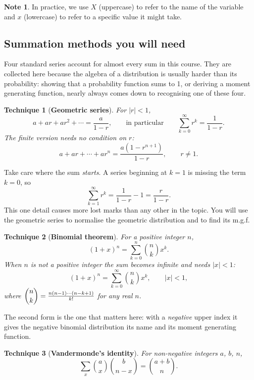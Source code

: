 \documentclass[12pt,a4paper]{report}
\theoremstyle{definition}
\newtheorem{note}[thm]{Note}
\theoremstyle{plain}
\newtheorem{tech}{Technique}[section]
\theoremstyle{definition}
\begin{document}
\begin{note}
In practice, we use $X$ (uppercase) to refer to the name of the variable and $x$ (lowercase) to refer to a specific value it might take. 
\end{note}








\subsection{Summation methods you will need}

Four standard series account for almost every sum in this course. They are collected here
because the algebra of a distribution is usually harder than its probability: showing that
a probability function sums to 1, or deriving a moment generating function, nearly always
comes down to recognising one of these four.

\begin{tech}[\textbf{Geometric series}]
For $|r|<1$,
\[a+ar+ar^{2}+\cdots = \frac{a}{1-r}, \qquad\text{in particular}\qquad
\sum_{k=0}^{\infty}r^{k} = \frac{1}{1-r}.\]
The finite version needs no condition on $r$:
\[a+ar+\cdots+ar^{n} = \frac{a\left(1-r^{n+1}\right)}{1-r}, \qquad r\neq 1.\]
\end{tech}

Take care where the sum \emph{starts}. A series beginning at $k=1$ is missing the term
$k=0$, so
\[\sum_{k=1}^{\infty}r^{k} = \frac{1}{1-r}-1 = \frac{r}{1-r}.\]
This one detail causes more lost marks than any other in the topic. You will use the
geometric series to normalise the geometric distribution and to find its m.g.f.

\begin{tech}[\textbf{Binomial theorem}]
For a positive integer $n$,
\[(1+x)^{n} = \sum_{k=0}^{n}\binom{n}{k}x^{k}.\]
When $n$ is \emph{not} a positive integer the sum becomes infinite and needs $|x|<1$:
\[(1+x)^{n} = \sum_{k=0}^{\infty}\binom{n}{k}x^{k}, \qquad |x|<1,\]
where $\dbinom{n}{k} = \frac{n(n-1)\cdots(n-k+1)}{k!}$ for any real $n$.
\end{tech}

The second form is the one that matters here: with a \emph{negative} upper index it gives
the negative binomial distribution its name and its moment generating function.

\begin{tech}[\textbf{Vandermonde's identity}]
For non-negative integers $a$, $b$, $n$,
\[\sum_{x}\binom{a}{x}\binom{b}{n-x} = \binom{a+b}{n}.\]
\end{tech}
\end{document}
